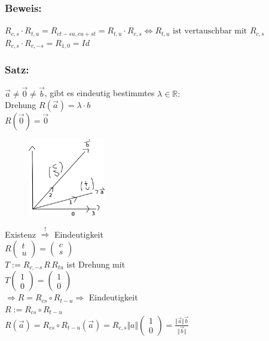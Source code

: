 \subsubsection{Beweis:}
$R_{c,s} \cdot R_{t,u}=R_{ct-su,cu+st}=R_{t,u} \cdot R_{c,s} \Leftrightarrow R_{t,u}\textrm{ ist vertauschbar mit } R_{c,s}$ \\
$R_{c,s}\cdot R_{c,-s} = R_{1,0} = Id$\\
%
%
%
\subsubsection{Satz:}
$\vec{a} \neq \vec{0} \neq \vec{b}$, gibt es eindeutig bestimmtes $\lambda \in \mathbb{R}:$\\
Drehung $ R(\vec{a})=\lambda \cdot b$\\
$R(\vec{0})=\vec{0}$\\
%
\begin{figure}[H]
\centering
\includegraphics[width=0.3\textwidth]{mainmatter/chapter1/pics/bewegung3.png}
\end{figure}
%
Existenz $\mathop{\Rightarrow}\limits^{\text{!}}$ Eindeutigkeit\\
$R\begin{pmatrix} t \\ u \end{pmatrix} = \begin{pmatrix} c \\ s \end{pmatrix}$\\
$T:= R_{c,-s} \, R \, R_{tu}$ ist Drehung mit\\
$T\begin{pmatrix} 1 \\ 0 \end{pmatrix} = \begin{pmatrix} 1 \\ 0 \end{pmatrix}$\\
$\Rightarrow R = R_{cs} \circ R_{t-u} \Rightarrow$ Eindeutigkeit \\
$R:= R_{cs} \circ R_{t-u}$\\
$R(\vec{a}) = R_{cs} \circ R_{t-u} (\vec{a}) = R_{c,s} \Vert a \Vert \begin{pmatrix} 1 \\ 0 \end{pmatrix} = \frac{\Vert \vec{a}\Vert \vec{b}}{\Vert \vec{b} \Vert}$
%
%
%
